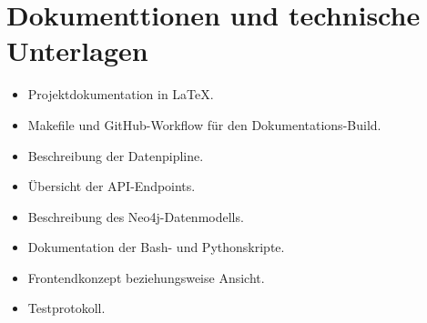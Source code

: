 \section{Dokumenttionen und technische Unterlagen}

\begin{itemize}[itemsep=0.4pt]
    \item Projektdokumentation in LaTeX.
    \item Makefile und GitHub-Workflow für den Dokumentations-Build.
    \item Beschreibung der Datenpipline.
    \item Übersicht der API-Endpoints.
    \item Beschreibung des Neo4j-Datenmodells.
    \item Dokumentation der Bash- und Pythonskripte.
    \item Frontendkonzept beziehungsweise Ansicht.
    \item Testprotokoll.
\end{itemize}